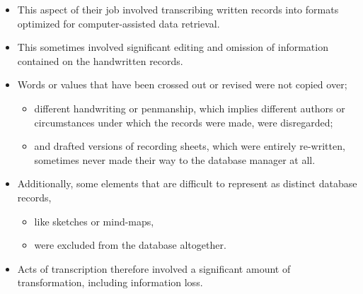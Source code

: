 \documentclass{article}
\begin{document}
\begin{itemize}
  \item This aspect of their job involved transcribing written records into formats optimized for computer-assisted data retrieval.\\
  
  \item This sometimes involved significant editing and omission of information contained on the handwritten records.
  \item Words or values that have been crossed out or revised were not copied over;
  \begin{itemize}
    \item different handwriting or penmanship, which implies different authors or circumstances under which the records were made, were disregarded;
    \item and drafted versions of recording sheets, which were entirely re-written, sometimes never made their way to the database manager at all.
  \end{itemize}\vspace{1em}
  
  \item Additionally, some elements that are difficult to represent as distinct database records,
  \begin{itemize}
    \item like sketches or mind-maps,
    \item were excluded from the database altogether.
  \end{itemize}\vspace{1em}
  
  \item Acts of transcription therefore involved a significant amount of transformation, including information loss.
\end{itemize}
\end{document}
